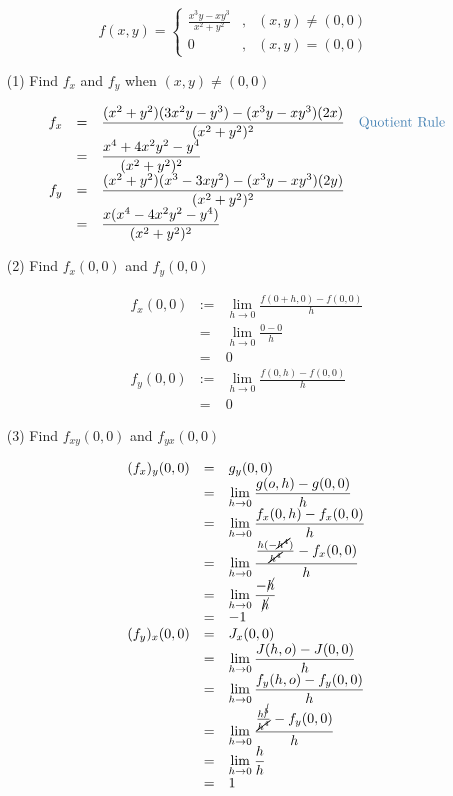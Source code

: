 \begin{eg}
\[f(x, y) = \left\{\begin{array}{ccl}
\displaystyle \frac{x^3y - xy^3}{x^2 + y^2} &, & (x, y ) \neq (0, 0)\\
0 &, & (x, y) = (0, 0)
\end{array}\right.\]
\begin{itemize}
\item[(1)] Find \(f_x\) and \(f_y\) when \((x, y) \neq (0, 0)\)

\soln
\[\begin{array}{rcl}
f_x & = & \displaystyle \frac{(x^2 + y^2)(3x^2y - y^3) - (x^3y - xy^3)(2x)}{(x^2 + y^2)^2} \quad \tssteelblue{\text{Quotient Rule}}\\
& = & \displaystyle \frac{x^4 + 4x^2y^2 - y^4}{(x^2 + y^2)^2}\\
f_y & = & \displaystyle \frac{(x^2 + y^2)(x^3 - 3xy^2) - (x^3y - xy^3)(2y)}{(x^2 + y^2)^2}\\
& = & \displaystyle \frac{x(x^4 - 4x^2y^2 - y^4)}{(x^2 + y^2)^2}
\end{array}\]
\item[(2)] Find \(f_x(0, 0)\) and \(f_y(0, 0)\)

\soln
\[\begin{array}{rcl}
f_x(0, 0) & := & \displaystyle \lim_{h \to 0} \frac{f(0 + h, 0) - f(0, 0)}{h}\\
& = & \displaystyle \lim_{h \to 0} \frac{0 - 0}{h}\\
& = & 0\\
f_y(0, 0) & := & \displaystyle \lim_{h \to 0} \frac{f(0, h) - f(0, 0)}{h}\\
& = & 0
\end{array}\]
\item[(3)] Find \(f_{xy}(0, 0)\) and \(f_{yx}(0, 0)\)

\soln
\[\begin{array}{rcl}
(f_x)_y (0, 0) & = & g_y(0, 0)\\
& = & \displaystyle \lim_{h \to 0} \frac{g(o, h) - g(0, 0)}{h}\\
& = & \displaystyle \lim_{h \to 0} \frac{f_x(0, h) - f_x(0, 0)}{h}\\
& = & \displaystyle \lim_{h \to 0} \frac{\frac{h(-\cancel{h^4})}{\cancel{h^4}} - f_x(0, 0)}{h}\\
& = & \displaystyle \lim_{h \to 0} \frac{-\cancel{h}}{\cancel{h}}\\
& = & -1\\
(f_y)_x (0, 0) & = & J_x(0, 0)\\
& = & \displaystyle \lim_{h \to 0} \frac{J(h, o) - J(0, 0)}{h}\\
& = & \displaystyle \lim_{h \to 0} \frac{f_y(h, o) - f_y(0 , 0)}{h}\\
& = & \displaystyle \lim_{h \to 0} \frac{\frac{h^{\cancel5}}{\cancel{h^4}} - f_y(0, 0)}{h}\\
& = & \displaystyle \lim_{h \to 0} \frac{h}{h}\\
& = & 1
\end{array}\]
\end{itemize}
\end{eg}
